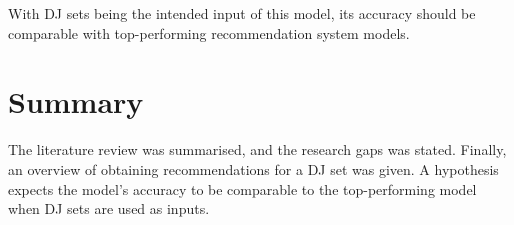 With DJ sets being the intended input of this model, its accuracy should be comparable with top-performing recommendation system models.

\section{Summary}
The literature review was summarised, and the research gaps was stated. Finally, an overview of obtaining recommendations for a DJ set was given. A hypothesis expects the model's accuracy to be comparable to the top-performing model when DJ sets are used as inputs. 




